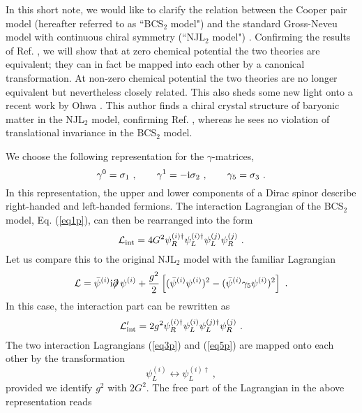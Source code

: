 \documentclass[a4paper,twocolumn,aps]{revtex4}
\begin{document}
In this short note, we would like to clarify the relation between the Cooper pair model \cite{R1}
(hereafter referred to as ``BCS$_2$ model") and the standard Gross-Neveu model with continuous chiral symmetry
(``NJL$_2$ model") \cite{R2,R6}. Confirming the results of Ref. \cite{R1a}, we will show that at zero
chemical potential the two theories are equivalent; they can in fact be mapped into each other
by a canonical transformation. At non-zero chemical potential the two
theories are no longer equivalent but nevertheless closely related. This also sheds
some new light onto a recent work by Ohwa \cite{R7}. This author finds a chiral crystal structure of baryonic matter
in the NJL$_2$ model, confirming Ref. \cite{R8}, whereas he sees no violation of translational invariance
in the BCS$_2$ model. 

We choose the following representation for the $\gamma$-matrices,
\begin{equation}
\gamma^0 = \sigma_1 \ , \qquad \gamma^1 = - {\rm i} \sigma_2 \ , \qquad \gamma_5 = \sigma_3 \ .
\label{eq2p}
\end{equation}
In this representation, the upper and lower components of a Dirac spinor describe right-handed
and left-handed fermions. The interaction Lagrangian of the BCS$_2$ model, Eq. (\ref{eq1p}),
can then be rearranged into the form
\begin{equation}
{\cal L}_{\rm int} = 4 G^2 \psi_R^{(i)\dagger} \psi_L^{(i)\dagger} \psi_L^{(j)} \psi_R^{(j)} \ .
\label{eq3p}
\end{equation}
Let us compare this to the original NJL$_2$ model \cite{R2} with the familiar Lagrangian
\begin{equation}
{\cal L}= \bar{\psi}^{(i)} {\rm i} \partial \!\!\!/ \, \psi^{(i)} +
\frac{g^2}{2}\left[ (\bar{\psi}^{(i)}\psi^{(i)})^2- (\bar{\psi}^{(i)} \gamma_5 \psi^{(i)})^2 \right] \ .
\label{eq4p}
\end{equation}
In this case, the interaction part can be rewritten as 
\begin{equation}
{\cal L}_{\rm int}' = 2 g^2 \psi_R^{(i)\dagger} \psi_L^{(i)} \psi_L^{(j)\dagger} \psi_R^{(j)} \ .
\label{eq5p}
\end{equation}
The two interaction Lagrangians (\ref{eq3p}) and (\ref{eq5p}) are mapped onto
each other by the transformation
\begin{equation}
\psi_L^{(i)} \leftrightarrow \psi_L^{(i)\dagger} \ ,
\label{eq6p}
\end{equation}
provided we identify $g^2$ with $2G^2$.
The free part of the Lagrangian in the above representation reads
\end{document}
